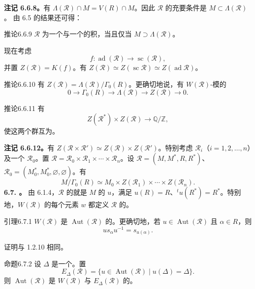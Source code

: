 \textbf{注记 6.6.8。}有 $\Lambda(\mathscr R)\cap M=V(R)\cap M$。因此 $\mathscr R$ 的充要条件是 $M\subset\Lambda(\mathscr R)$。
由 6.5 的结果还可得：
\begin{SGAresult}{推论}{6.6.9}
$\mathscr R$ 为一个与一个的积，当且仅当 $M\supset\Lambda(\mathscr R)$。
\end{SGAresult}
现在考虑
\[f:\operatorname{ad}(\mathscr R)\longrightarrow\operatorname{sc}(\mathscr R),\]
并置 $Z(\mathscr R)=K(f)$。有 $Z(\mathscr R)\simeq Z(\operatorname{sc}\mathscr R)\simeq Z(\operatorname{ad}\mathscr R)$。
\begin{SGAresult}{推论}{6.6.10}
有 $Z(\mathscr R)=\Lambda(\mathscr R)/\Gamma_0(R)$。更确切地说，有 $W(\mathscr R)$-模的
\[0\longrightarrow\Gamma_0(R)\longrightarrow\Lambda(\mathscr R)\longrightarrow Z(\mathscr R)\longrightarrow0.\]
\end{SGAresult}
\begin{SGAresult}{推论}{6.6.11}
有
\[Z(\mathscr R^*)\times Z(\mathscr R)\longrightarrow\mathbb Q/\mathbb Z,\]
使这两个群互为。
\end{SGAresult}
\textbf{注记 6.6.12。}有 $Z(\mathscr R\times\mathscr R')\simeq Z(\mathscr R)\times Z(\mathscr R')$。特别考虑 $\mathscr R_i$（$i=1,2,\ldots,n$）及一个 $\mathscr R_0$。置 $\mathscr R=\mathscr R_0\times\mathscr R_1\times\cdots\times\mathscr R_n$。设 $\mathscr R=(M,M^*,R,R^*)$、$\mathscr R_0=(M_0^*,M_0^*,\varnothing,\varnothing)$。有
\[M/\Gamma_0(R)\simeq M_0\times Z(\mathscr R_1)\times\cdots\times Z(\mathscr R_n).\]
\textbf{6.7. 。}
由 6.1.4，$\mathscr R$ 的就是 $M$ 的 $u$，满足 $u(R)=R$、${}^tu(R^*)=R^*$。特别地，$W(\mathscr R)$ 的每个元素 $w$ 都定义 $\mathscr R$ 的。
\begin{SGAresult}{引理}{6.7.1}
$W(\mathscr R)$ 是 $\operatorname{Aut}(\mathscr R)$ 的。更确切地，若 $u\in\operatorname{Aut}(\mathscr R)$ 且 $\alpha\in R$，则
\[us_\alpha u^{-1}=s_{u(\alpha)}.\]
\end{SGAresult}
证明与 1.2.10 相同。
\begin{SGAresult}{命题}{6.7.2}
设 $\Delta$ 是一个。置
\[E_\Delta(\mathscr R)=\{u\in\operatorname{Aut}(\mathscr R)\mid u(\Delta)=\Delta\}.\]
则 $\operatorname{Aut}(\mathscr R)$ 是 $W(\mathscr R)$ 与 $E_\Delta(\mathscr R)$ 的。
\end{SGAresult}
